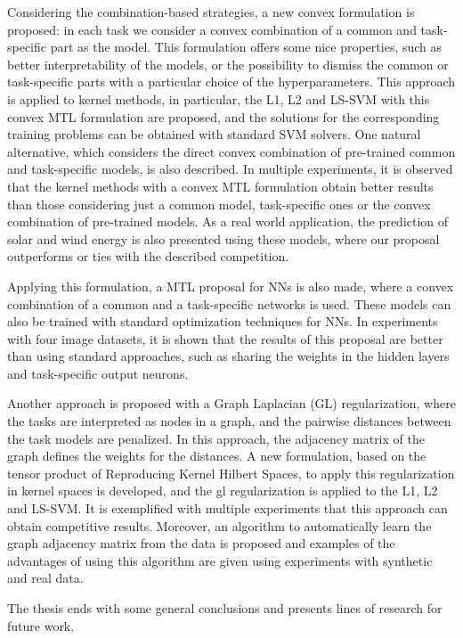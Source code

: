 \documentclass[a4paper, 11pt]{Thesis}  %
\begin{document}
{{Considering the combination-based strategies, a new convex formulation is proposed: in each task we consider a convex combination of a common and task-specific part as the model. This formulation offers some nice properties, such as better interpretability of the models, or the possibility to dismiss the common or task-specific parts with a particular choice of the hyperparameters.
This approach is applied to kernel methods, in particular, the L1, L2 and LS-SVM with this convex MTL formulation are proposed, and the solutions for the corresponding training problems can be obtained with standard SVM solvers.
One natural alternative, which considers the direct convex combination of pre-trained common and task-specific models, is also described.
In multiple experiments, it is observed that the kernel methods with a convex MTL formulation obtain better results than those considering just a common model, task-specific ones or the convex combination of pre-trained models.
As a real world application, the prediction of solar and wind energy is also presented using these models, where our proposal outperforms or ties with the described competition.

%
Applying this formulation, a MTL proposal for NNs is also made, where a convex combination of a common and a task-specific networks is used. These models can also be trained with standard optimization techniques for NNs.
In experiments with four image datasets, it is shown that the results of this proposal are better than using standard approaches, such as sharing the weights in the hidden layers and task-specific output neurons.


Another approach is proposed with a Graph Laplacian (GL) regularization, where the tasks are interpreted as nodes in a graph, and the pairwise distances between the task models are penalized. In this approach, the adjacency matrix of the graph defines the weights for the distances. A new formulation, based on the tensor product of Reproducing Kernel Hilbert Spaces, to apply this regularization in kernel spaces is developed, and the \acrshort{gl} regularization is applied to the L1, L2 and LS-SVM. 
It is exemplified with multiple experiments that this approach can obtain competitive results. 
%
Moreover, an algorithm to automatically learn the graph adjacency matrix from the data is proposed and examples of the advantages of using this algorithm are given using experiments with synthetic and real data.

The thesis ends with some general conclusions and presents lines of research for future work. 
%
}

}
\end{document}
